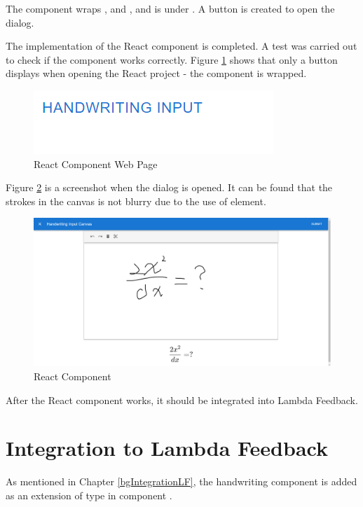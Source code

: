 \documentclass[12pt,twoside]{report}
\begin{document}
The  component wraps ,  and , and is under . A button is created to open the dialog.

The implementation of the React component is completed. A test was carried out
to check if the component works correctly. Figure
\ref{fig:react-component-webpage} shows that only a button displays when opening the React project - the component is wrapped.
\begin{figure}[h]
    \centering
    \includegraphics[width=0.4\linewidth, frame]{figures/react-component-button.png}
    \caption{React Component Web Page}
    \label{fig:react-component-webpage}
\end{figure}

Figure \ref{fig:react-component-dialog} is a screenshot when the dialog is
opened. It can be found that the strokes in the canvas is not blurry due to the
use of  element.
\begin{figure}[h]
    \centering
    \includegraphics[width=\linewidth, frame]{figures/react-component-dialog.png}
    \caption{React Component}
    \label{fig:react-component-dialog}
\end{figure}

After the React component works, it should be integrated into Lambda Feedback.

\section{Integration to Lambda Feedback}
As mentioned in Chapter \ref{bgIntegrationLF}, the handwriting component is added as an extension of type  in component . 
\end{document}
